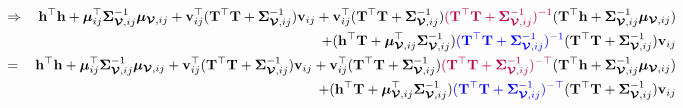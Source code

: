 \documentclass[12pt]{article}
\newcommand{\0}{\mathbf{0}}
\begin{document}
\begin{eqnarray*}
& \Rightarrow & \mathbf{h}^{\top} \mathbf{h} + \boldsymbol{\mu}_{ij}^{\top} \boldsymbol{\Sigma}_{\boldsymbol{\mathcal{V}}, ij}^{-1} \boldsymbol{\mu}_{\boldsymbol{\mathcal{V}}, ij} + \mathbf{v}_{ij}^{\top} ( \mathbf{T}^{\top} \mathbf{T} + \boldsymbol{\Sigma}_{\boldsymbol{\mathcal{V}}, ij}^{-1} ) \mathbf{v}_{ij} + \mathbf{v}_{ij}^{\top} ( \mathbf{T}^{\top} \mathbf{T} + \boldsymbol{\Sigma}_{\boldsymbol{\mathcal{V}}, ij}^{-1} ) \textcolor{purple}{ ( \mathbf{T}^{\top} \mathbf{T} + \boldsymbol{\Sigma}_{\boldsymbol{\mathcal{V}}, ij}^{-1} )^{-1} } (\mathbf{T}^{\top} \mathbf{h} + \boldsymbol{\Sigma}_{\boldsymbol{\mathcal{V}}, ij}^{-1}\boldsymbol{\mu}_{\boldsymbol{\mathcal{V}}, ij} ) \\
&& + ( \mathbf{h}^{\top} \mathbf{T} + \boldsymbol{\mu}_{\boldsymbol{\mathcal{V}}, ij}^{\top} \boldsymbol{\Sigma}_{\boldsymbol{\mathcal{V}}, ij}^{-1}) \textcolor{blue}{( \mathbf{T}^{\top} \mathbf{T} + \boldsymbol{\Sigma}_{\boldsymbol{\mathcal{V}}, ij}^{-1} )^{-1}} ( \mathbf{T}^{\top} \mathbf{T} + \boldsymbol{\Sigma}_{\boldsymbol{\mathcal{V}}, ij}^{-1} ) \mathbf{v}_{ij} \\
& = & \mathbf{h}^{\top} \mathbf{h} + \boldsymbol{\mu}_{ij}^{\top} \boldsymbol{\Sigma}_{\boldsymbol{\mathcal{V}}, ij}^{-1} \boldsymbol{\mu}_{\boldsymbol{\mathcal{V}}, ij} + \mathbf{v}_{ij}^{\top} ( \mathbf{T}^{\top} \mathbf{T} + \boldsymbol{\Sigma}_{\boldsymbol{\mathcal{V}}, ij}^{-1} ) \mathbf{v}_{ij} + \mathbf{v}_{ij}^{\top} ( \mathbf{T}^{\top} \mathbf{T} + \boldsymbol{\Sigma}_{\boldsymbol{\mathcal{V}}, ij}^{-1} ) \textcolor{purple}{ ( \mathbf{T}^{\top} \mathbf{T} + \boldsymbol{\Sigma}_{\boldsymbol{\mathcal{V}}, ij}^{-1} )^{-\top} } ( \mathbf{T}^{\top} \mathbf{h} + \boldsymbol{\Sigma}_{\boldsymbol{\mathcal{V}}, ij}^{-1}\boldsymbol{\mu}_{\boldsymbol{\mathcal{V}}, ij} ) \\
&& + ( \mathbf{h}^{\top} \mathbf{T} + \boldsymbol{\mu}_{\boldsymbol{\mathcal{V}}, ij}^{\top} \boldsymbol{\Sigma}_{\boldsymbol{\mathcal{V}}, ij}^{-1}) \textcolor{blue}{( \mathbf{T}^{\top} \mathbf{T} + \boldsymbol{\Sigma}_{\boldsymbol{\mathcal{V}}, ij}^{-1} )^{-\top}} ( \mathbf{T}^{\top} \mathbf{T} + \boldsymbol{\Sigma}_{\boldsymbol{\mathcal{V}}, ij}^{-1} ) \mathbf{v}_{ij} 
\end{eqnarray*}
\end{document}
